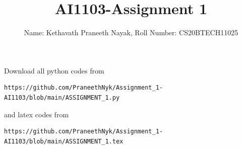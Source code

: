 \documentclass[journal,12pt,twocolumn]{IEEEtran}
\DeclareMathOperator*{\Res}{Res}
\begin{document}
\newcommand{\BEQA}{\begin{eqnarray}}
\newcommand{\EEQA}{\end{eqnarray}}
\newcommand{\define}{\stackrel{\triangle}{=}}

\raggedbottom
\setlength{\parindent}{0pt}
\providecommand{\mbf}{\mathbf}
\providecommand{\pr}[1]{\ensuremath{\Pr\left(#1\right)}}
\providecommand{\qfunc}[1]{\ensuremath{Q\left(#1\right)}}
\providecommand{\sbrak}[1]{\ensuremath{{}\left[#1\right]}}
\providecommand{\lsbrak}[1]{\ensuremath{{}\left[#1\right.}}
\providecommand{\rsbrak}[1]{\ensuremath{{}\left.#1\right]}}
\providecommand{\brak}[1]{\ensuremath{\left(#1\right)}}
\providecommand{\lbrak}[1]{\ensuremath{\left(#1\right.}}
\providecommand{\rbrak}[1]{\ensuremath{\left.#1\right)}}
\providecommand{\cbrak}[1]{\ensuremath{\left\{#1\right\}}}
\providecommand{\lcbrak}[1]{\ensuremath{\left\{#1\right.}}
\providecommand{\rcbrak}[1]{\ensuremath{\left.#1\right\}}}
\theoremstyle{remark}
\newtheorem{rem}{Remark}
\newcommand{\sgn}{\mathop{\mathrm{sgn}}}
\providecommand{\abs}[1]{\vert#1\vert}
\providecommand{\res}[1]{\Res\displaylimits_{#1}} 
\providecommand{\norm}[1]{\lVert#1\rVert}
\providecommand{\mtx}[1]{\mathbf{#1}}
\providecommand{\mean}[1]{E[ #1 ]}
\providecommand{\fourier}{\overset{\mathcal{F}}{ \rightleftharpoons}}
\providecommand{\system}{\overset{\mathcal{H}}{ \longleftrightarrow}}
\newcommand{\solution}{\noindent \textbf{Solution: }}
\newcommand{\cosec}{\,\text{cosec}\,}
\providecommand{\dec}[2]{\ensuremath{\overset{#1}{\underset{#2}{\gtrless}}}}
\newcommand{\myvec}[1]{\ensuremath{\begin{pmatrix}#1\end{pmatrix}}}
\newcommand{\mydet}[1]{\ensuremath{\begin{vmatrix}#1\end{vmatrix}}}
\makeatletter
{}
\makeatother
\let\StandardTheFigure\thefigure
\let\vec\mathbf
\renewcommand{\thefigure}{\theproblem}
\def\putbox#1#2#3{\makebox[0in][l]{\makebox[#1][l]{}\raisebox{\baselineskip}[0in][0in]{\raisebox{#2}[0in][0in]{#3}}}}
     \def\rightbox#1{\makebox[0in][r]{#1}}
     \def\centbox#1{\makebox[0in]{#1}}
     \def\topbox#1{\raisebox{-\baselineskip}[0in][0in]{#1}}
     \def\midbox#1{\raisebox{-0.5\baselineskip}[0in][0in]{#1}}
\vspace{3cm}
\title{AI1103-Assignment 1}
\author{Name: Kethavath Praneeth Nayak, Roll Number: CS20BTECH11025}
\maketitle
\newpage
\bigskip
\renewcommand{\thefigure}{\theenumi}
\renewcommand{\thetable}{\theenumi}
Download all python codes from 
\begin{lstlisting}
https://github.com/PraneethNyk/Assignment_1-AI1103/blob/main/ASSIGNMENT_1.py
\end{lstlisting}
%
and latex codes from 
%
\begin{lstlisting}
https://github.com/PraneethNyk/Assignment_1-AI1103/blob/main/ASSIGNMENT_1.tex
\end{lstlisting}
\end{document}
